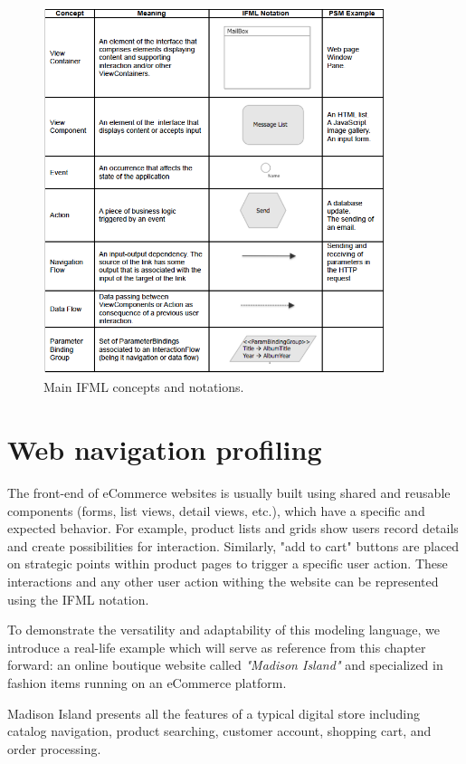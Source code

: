 \vspace{0.5cm}
\begin{figure}[H]
  \centering
    \includegraphics[width=10cm]{images/ifml.jpg}
  \caption{Main IFML concepts and notations.}
  \label{fig:ifml}
\end{figure}
\vspace{0.5cm}

\newpage

\section{Web navigation profiling}
\label{navigational-modeling-for-the-web}
The front-end of eCommerce websites is usually built using shared and reusable components (forms, list views, detail views, etc.), which have a specific and expected behavior.
For example, product lists and grids show users record details and create possibilities for interaction. Similarly, "add to cart" buttons are placed on strategic points within product pages to trigger a specific user action.
These interactions and any other user action withing the website can be represented using the IFML notation.

To demonstrate the versatility and adaptability of this modeling language, we introduce a real-life example which will serve as reference from this chapter forward: an online boutique website called \textit{"Madison Island"} and specialized in fashion items running on an eCommerce platform.

Madison Island presents all the features of a typical digital store including catalog navigation, product searching, customer account, shopping cart, and order processing. 

